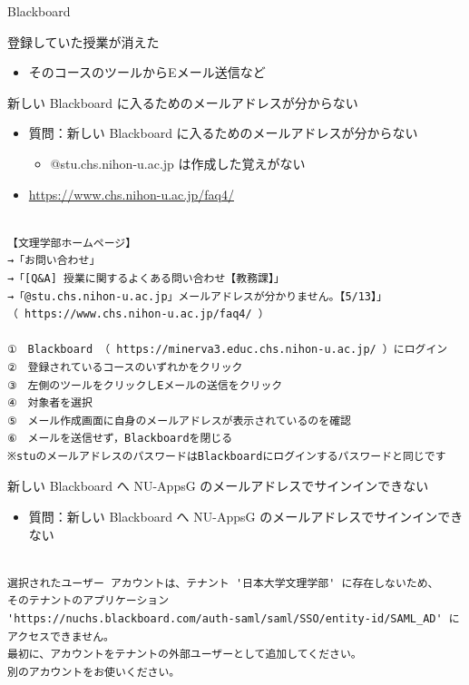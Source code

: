\documentclass[a4j,10pt]{jsarticle}
\begin{document}
{\begin{frame}[label={sec:org166405d},fragile]{Blackboard}
\begin{block}{登録していた授業が消えた}
\begin{itemize}
\begin{itemize}
\item そのコースのツールからEメール送信など
\end{itemize}
\end{itemize}
\end{block}
\par
\begin{block}{新しい Blackboard に入るためのメールアドレスが分からない}
\begin{itemize}
\item 質問：新しい Blackboard に入るためのメールアドレスが分からない
\begin{itemize}
\item @stu.chs.nihon-u.ac.jp は作成した覚えがない
\end{itemize}
\par
\item \url{https://www.chs.nihon-u.ac.jp/faq4/}
\end{itemize}
\par
\begin{verbatim}

【文理学部ホームページ】
→「お問い合わせ」
→「[Q&A] 授業に関するよくある問い合わせ【教務課】」
→「@stu.chs.nihon-u.ac.jp」メールアドレスが分かりません。【5/13】」
（ https://www.chs.nihon-u.ac.jp/faq4/ ）

①　Blackboard （ https://minerva3.educ.chs.nihon-u.ac.jp/ ）にログイン
②　登録されているコースのいずれかをクリック
③　左側のツールをクリックしEメールの送信をクリック
④　対象者を選択
⑤　メール作成画面に自身のメールアドレスが表示されているのを確認
⑥　メールを送信せず，Blackboardを閉じる
※stuのメールアドレスのパスワードはBlackboardにログインするパスワードと同じです\end{verbatim}

\end{block}
\par
\begin{block}{新しい Blackboard へ NU-AppsG のメールアドレスでサインインできない}
\begin{itemize}
\item 質問：新しい Blackboard へ NU-AppsG のメールアドレスでサインインできない
\end{itemize}
\par
\begin{verbatim}

選択されたユーザー アカウントは、テナント '日本大学文理学部' に存在しないため、
そのテナントのアプリケーション
'https://nuchs.blackboard.com/auth-saml/saml/SSO/entity-id/SAML_AD' にアクセスできません。
最初に、アカウントをテナントの外部ユーザーとして追加してください。
別のアカウントをお使いください。\end{verbatim}


\end{block}
\end{frame}}
\end{document}
